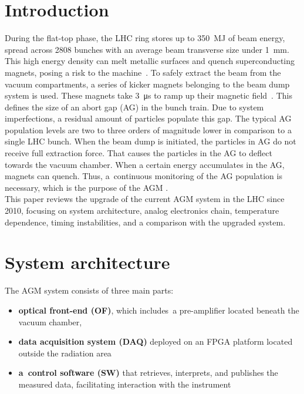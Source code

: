 \section{Introduction}
During the flat-top phase, the LHC ring stores up to \SI{350}{MJ} of beam energy,
spread across 2808 bunches with an average beam transverse size under
\SI{1}{mm}. This high energy density can melt metallic surfaces and quench
superconducting magnets, posing a risk to the machine~\cite{LHC_report}. 
To safely extract the beam from the vacuum compartments, a series of kicker
magnets belonging to the beam dump system is used. These magnets take \SI{3}{\micro\second} to
ramp up their magnetic field~\cite{beam_dump_system}. This defines the size of
an abort gap (AG) in the bunch train. Due to system imperfections, a residual amount of particles populate this gap.  The typical AG population levels are two to three orders of magnitude lower in comparison to a single LHC bunch.
When the beam dump is initiated, the particles in AG do not receive full
extraction force. That causes the particles in the AG to deflect towards the vacuum chamber. When a certain energy accumulates in the AG, magnets can quench. Thus,
a~continuous monitoring of the AG population is necessary, which is the purpose
of the AGM \cite{particles_in_ag}.\\
This paper reviews the upgrade of the current AGM system in the LHC since 2010,
focusing on system architecture, analog electronics chain, temperature
dependence, timing instabilities, and a comparison with the upgraded system.

\section{System architecture}
The AGM system consists of three main parts:

\begin{itemize}
    \item \textbf{optical front-end (OF)}, which includes~a pre-amplifier located beneath the vacuum chamber,
    \item \textbf{data acquisition system (DAQ)} deployed on an FPGA platform located outside the radiation area
    \item \textbf{a~control software (SW)} that retrieves, interprets, and publishes the measured data, facilitating interaction with the instrument
\end{itemize}

